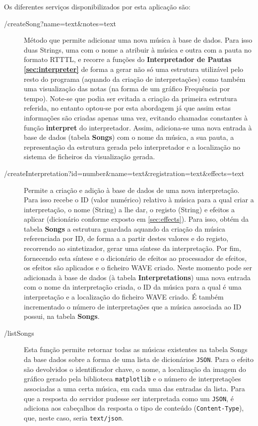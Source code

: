 \documentclass[a4paper,11pt,openright,oneside]{report}
\begin{document}
Os diferentes serviços disponibilizados por esta aplicação são:

\begin{description}
\item[/createSong?name=text\&notes=text]
Método que permite adicionar uma nova música à base de dados. Para isso duas Strings, uma com o nome a atribuir à música e outra com a pauta no formato RTTTL, e recorre a funções do \textbf{Interpretador de Pautas \ref{sec:interpreter}} de forma a gerar não só uma estrutura utilizável pelo resto do programa (aquando da criação de interpretações) como também uma visualização das notas (na forma de um gráfico Frequência por tempo). Note-se que podia ser evitada a criação da primeira estrutura referida, no entanto optou-se por esta abordagem já que assim estas informações são criadas apenas uma vez, evitando chamadas constantes à função \textbf{interpret} do interpretador. Assim, adiciona-se uma nova entrada à base de dados (tabela \textbf{Songs}) com o nome da música, a sua pauta, a representação da estrutura gerada pelo interpretador e a localização no sistema de ficheiros da visualização gerada.
\item[/createInterpretation?id=number\&name=text\&registration=text\&effects=text]
Permite a criação e adição à base de dados de uma nova interpretação. Para isso recebe o ID (valor numérico) relativo à música para a qual criar a interpretação, o nome (String) a lhe dar, o registo (String) e efeitos a aplicar (dicionário conforme exposto em \ref{sec:effects}). Para isso, obtém da tabela \textbf{Songs} a estrutura guardada aquando da criação da música referenciada por ID, de forma a a partir destes valores e do registo, recorrendo ao sintetizador, gerar uma síntese da interpretação. Por fim, fornecendo esta síntese e o dicionário de efeitos ao processador de efeitos, os efeitos são aplicados e o ficheiro WAVE criado. Neste momento pode ser adicionada à base de dados (à tabela \textbf{Interpretations}) uma nova entrada com o nome da interpretação criada, o ID da música para a qual é uma interpretação e a localização do ficheiro WAVE criado. É também incrementado o número de interpretações que a música associada ao ID possui, na tabela \textbf{Songs}.
\item[/listSongs]
Esta função permite retornar todas as músicas existentes na tabela Songs da base dados sobre a forma de uma lista de dicionários \verb|JSON|. Para o efeito são devolvidos o identificador chave, o nome, a localização da imagem do gráfico gerado pela biblioteca \texttt{matplotlib} e o número de interpretações associadas a uma certa música, em cada uma das entradas da lista. Para que a resposta do servidor pudesse ser interpretada como um \verb|JSON|, é adiciona aos cabeçalhos da resposta o tipo de conteúdo (\texttt{Content-Type}), que, neste caso, seria \texttt{text/json}.

\end{description}
\end{document}
